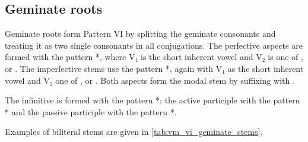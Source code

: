 \documentclass[grammar]{subfiles}
\begin{document}
 
\subsection{Geminate roots}
\label{ssec:vm_vi_geminate_roots}

Geminate roots form Pattern VI by splitting the geminate consonants and
treating it as two single consonants in all conjugations.  The perfective
aspects are formed with the pattern *, where V₁ is the short
inherent vowel and V₂ is one of ,  or .  The imperfective
stems use the pattern *, again with V₁ as the short inherent
vowel and V₂ one of ,  or .  Both aspects form the modal
stem by suffixing with . 

The infinitive is formed with the pattern *; the active
participle with the pattern * and the passive participle with the
pattern *. 

Examples of biliteral stems are given in \cref{tab:vm_vi_geminate_stems}. 

\begin{table}[h!]\small\capstart
  \centering
  \\
  \caption{Pattern VI biliteral stems \label{tab:vm_vi_geminate_stems}}
\end{table}
\end{document}
